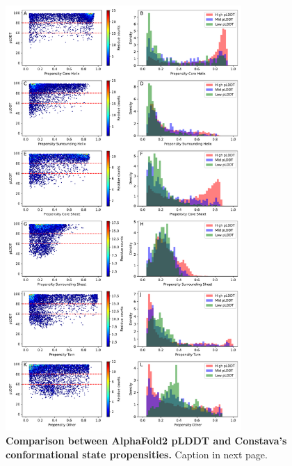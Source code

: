 \begin{figure}[H]
    \centering
    \includegraphics[width=0.8\textwidth]{pLDDT/plddt_figures/plddt_vs_conformational_state_propensities_hexbin_complete_hist.pdf}
    \caption{
    \textbf{Comparison between AlphaFold2 pLDDT and Constava's conformational state propensities.} Caption in next page. 
}
\end{figure}
